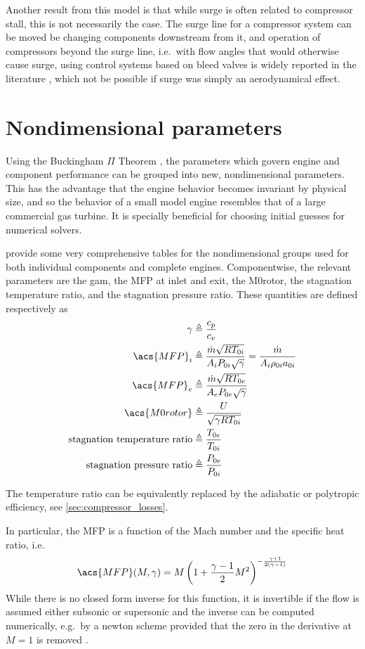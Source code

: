 Another result from this model is that while surge is often related to compressor stall, this is not necessarily the case.
The surge line for a compressor system can be moved be changing components downstream from it, and operation of compressors beyond the surge line, i.e.\ with flow angles that would otherwise cause surge, using control systems based on bleed valves is widely reported in the literature \cite[e.g.][]{Liaw2004}, which not be possible if surge was simply an aerodynamical effect.

\section{Nondimensional parameters}
\label{sec:nondimensional}

Using the Buckingham $\Pi$ Theorem \cite{Buckingham1914},
the parameters which govern engine and component performance can be grouped into new, nondimensional parameters. 
This has the advantage that the engine behavior becomes invariant by physical size, and so the behavior of a small model engine resembles that of a large commercial gas turbine. 
It is specially beneficial for choosing initial guesses for numerical solvers.

\textcite[chapter 4]{walsh2004gas} provide some very comprehensive tables 
for the nondimensional groups used for both individual components and complete engines.
Componentwise, the relevant parameters are the \acl{gam}, the \acl{MFP} at inlet and exit, 
the \acl{M0rotor}, the stagnation temperature ratio, and the stagnation pressure ratio. 
These quantities are defined respectively as
\begin{align}
    \gamma &\triangleq \frac{c_p}{c_v} \\
    \acs{MFP}_i &\triangleq \MFP{i} = \MFPalt{i} \label{eqn:MFPi}\\
    \acs{MFP}_e &\triangleq \MFP{e} \\
    \acs{M0rotor} &\triangleq \frac{U}{\sqrt{\gamma R T_{0i}}} \\
    \text{stagnation temperature ratio}&\triangleq\tr{0e}{0i} \\
    \text{stagnation pressure ratio}&\triangleq\pr{0e}{0i}
\end{align}

The temperature ratio can be equivalently replaced by the adiabatic or polytropic efficiency,
see \cref{sec:compressor_losses}.

In particular, the \acl{MFP} is a function of the Mach number and the specific heat ratio,
 i.e.\
\begin{equation}
    \label{eqn:mfp2mach}
    \acs{MFP}(M,\gamma) = M \left( 1 + \frac{\gamma-1}{2}M^2\right)^{-\frac{\gamma+1}{2(\gamma-1)}}
\end{equation}
While there is no closed form inverse for this function, it is invertible if the flow is assumed either subsonic or supersonic and the inverse can be computed numerically, e.g.\ by a newton scheme provided that the zero in the derivative at $M=1$ is removed \cite{Der1974}.

